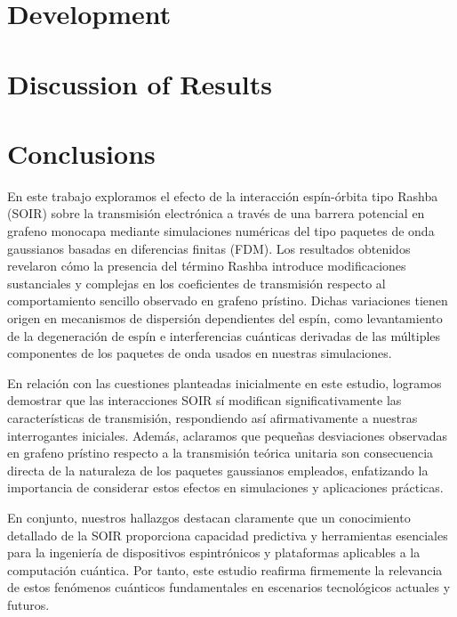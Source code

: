\documentclass[twocolumn, aps, prb, 10pt]{revtex4-2}
\begin{document}


    \section{Development}\label{sec:development}
    


    \section{Discussion of Results}\label{sec:discussion-of-results}
    


    \section{Conclusions}\label{sec:conclusions}

    En este trabajo exploramos el efecto de la interacción espín-órbita tipo Rashba (SOIR) sobre la transmisión electrónica a través de una barrera potencial en grafeno monocapa mediante simulaciones numéricas del tipo paquetes de onda gaussianos basadas en diferencias finitas (FDM). Los resultados obtenidos revelaron cómo la presencia del término Rashba introduce modificaciones sustanciales y complejas en los coeficientes de transmisión respecto al comportamiento sencillo observado en grafeno prístino.
    Dichas variaciones tienen origen en mecanismos de dispersión dependientes del espín, como levantamiento de la degeneración de espín e interferencias cuánticas derivadas de las múltiples componentes de los paquetes de onda usados en nuestras simulaciones.

    En relación con las cuestiones planteadas inicialmente en este estudio, logramos demostrar que las interacciones SOIR sí modifican significativamente las características de transmisión, respondiendo así afirmativamente a nuestras interrogantes iniciales.
    Además, aclaramos que pequeñas desviaciones observadas en grafeno prístino respecto a la transmisión teórica unitaria son consecuencia directa de la naturaleza de los paquetes gaussianos empleados, enfatizando la importancia de considerar estos efectos en simulaciones y aplicaciones prácticas.

    En conjunto, nuestros hallazgos destacan claramente que un conocimiento detallado de la SOIR proporciona capacidad predictiva y herramientas esenciales para la ingeniería de dispositivos espintrónicos y plataformas aplicables a la computación cuántica.
    Por tanto, este estudio reafirma firmemente la relevancia de estos fenómenos cuánticos fundamentales en escenarios tecnológicos actuales y futuros.
    \pagebreak


    
    
\end{document}

